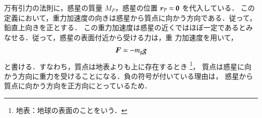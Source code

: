                 万有引力の法則に，惑星の質量 $M_{P}$，惑星の位置 $\boldsymbol{r}_{P}=\textbf{0}$ を代入している．
                この定義において，重力加速度の向きは惑星から質点に向かう方向である．従って，鉛直上向きを正とする．
                この重力加速度は惑星の近くではほぼ一定であるとみなせる．従って，惑星の表面付近から受ける力は，重
                力加速度を用いて，
                    \begin{align}
                        \boldsymbol{F} =- m_{\mathrm{g}}\textit{\textbf{g}}
                    \end{align}
                と書ける．すなわち，質点は地表よりも上に存在するとき
                    \footnote{
                        地表：地球の表面のことをいう．
                    }，
                質点は惑星に向かう方向に重力を受けることになる．負の符号が付いている理由は，
                惑星から質点に向かう方向を正方向にとっているため．
